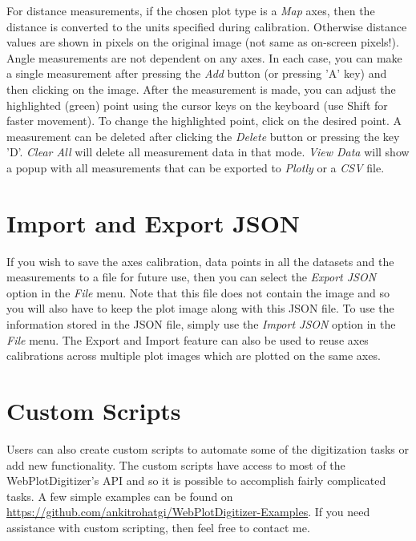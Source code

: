 \documentclass[letterpaper, 11pt]{article}
\begin{document}
For distance measurements, if the chosen plot type is a \emph{Map} axes, then the distance is converted to the units specified during calibration. Otherwise distance values are shown in pixels on the original image (not same as on-screen pixels!). Angle measurements are not dependent on any axes. In each case, you can make a single measurement after pressing the \emph{Add} button (or pressing 'A' key) and then clicking on the image. After the measurement is made, you can adjust the highlighted (green) point using the cursor keys on the keyboard (use Shift for faster movement). To change the highlighted point, click on the desired point. A measurement can be deleted after clicking the \emph{Delete} button or pressing the key 'D'. \emph{Clear All} will delete all measurement data in that mode. \emph{View Data} will show a popup with all measurements that can be exported to \emph{Plotly} or a \emph{CSV} file.

\section{Import and Export JSON}
\label{sec:jsonImportExport}
If you wish to save the axes calibration, data points in all the datasets and the measurements to a file for future use, then you can select the \emph{Export JSON} option in the \emph{File} menu. Note that this file does not contain the image and so you will also have to keep the plot image along with this JSON file. To use the information stored in the JSON file, simply use the \emph{Import JSON} option in the \emph{File} menu. The Export and Import feature can also be used to reuse axes calibrations across multiple plot images which are plotted on the same axes.

\section{Custom Scripts}
Users can also create custom scripts to automate some of the digitization tasks or add new functionality. The custom scripts have access to most of the WebPlotDigitizer's API and so it is possible to accomplish fairly complicated tasks. A few simple examples can be found on \url{https://github.com/ankitrohatgi/WebPlotDigitizer-Examples}. If you need assistance with custom scripting, then feel free to contact me.
\end{document}
